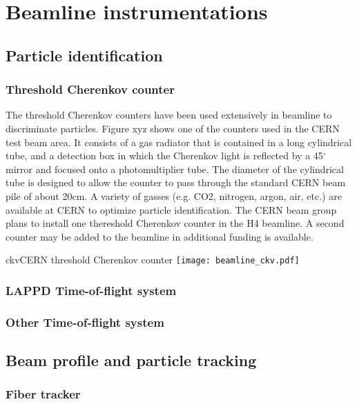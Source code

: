 \section{Beamline instrumentations}
\label{sec:beaminstruments}

\subsection{Particle identification}


\subsubsection{Threshold Cherenkov counter}
The threshold Cherenkov counters have been used extensively in beamline to discriminate particles. Figure xyz shows one of the counters used in the CERN test beam area. It consists of a gas radiator that is contained in a long cylindrical tube, and a detection box in which the Cherenkov light is reflected by a 45$^\circ$ mirror and focused onto a photomultiplier tube. The diameter of the cylindrical tube is designed to allow the counter to pass through the standard CERN beam pile of about 20cm. A variety of gasses (e.g. CO2, nitrogen, argon, air, etc.) are available at CERN to optimize particle identification. The CERN beam group plans to install one thereshold Cherenkov counter in the H4 beamline. A second counter may be added to the beamline in additional funding is available.
\begin{cdrfigure}{ckv}{CERN threshold Cherenkov counter}
  \texttt{[image: beamline\_ckv.pdf]}
\end{cdrfigure}


\subsubsection{LAPPD Time-of-flight system}

\subsubsection{Other Time-of-flight system}

\subsection{Beam profile and particle tracking}

\subsubsection{Fiber tracker}

